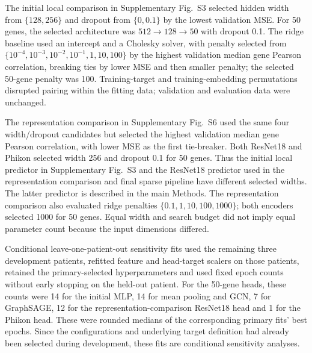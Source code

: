 The initial local comparison in Supplementary Fig.~S3 selected hidden width from $\{128,256\}$ and dropout from $\{0,0.1\}$ by the lowest validation MSE. For 50 genes, the selected architecture was $512\rightarrow128\rightarrow50$ with dropout 0.1. The ridge baseline used an intercept and a Cholesky solver, with penalty selected from $\{10^{-4},10^{-3},10^{-2},10^{-1},1,10,100\}$ by the highest validation median gene Pearson correlation, breaking ties by lower MSE and then smaller penalty; the selected 50-gene penalty was 100. Training-target and training-embedding permutations disrupted pairing within the fitting data; validation and evaluation data were unchanged.

The representation comparison in Supplementary Fig.~S6 used the same four width/dropout candidates but selected the highest validation median gene Pearson correlation, with lower MSE as the first tie-breaker. Both ResNet18 and Phikon selected width 256 and dropout 0.1 for 50 genes. Thus the initial local predictor in Supplementary Fig.~S3 and the ResNet18 predictor used in the representation comparison and final sparse pipeline have different selected widths. The latter predictor is described in the main Methods. The representation comparison also evaluated ridge penalties $\{0.1,1,10,100,1000\}$; both encoders selected 1000 for 50 genes. Equal width and search budget did not imply equal parameter count because the input dimensions differed.

Conditional leave-one-patient-out sensitivity fits used the remaining three development patients, refitted feature and head-target scalers on those patients, retained the primary-selected hyperparameters and used fixed epoch counts without early stopping on the held-out patient. For the 50-gene heads, these counts were 14 for the initial MLP, 14 for mean pooling and GCN, 7 for GraphSAGE, 12 for the representation-comparison ResNet18 head and 1 for the Phikon head. These were rounded medians of the corresponding primary fits' best epochs. Since the configurations and underlying target definition had already been selected during development, these fits are conditional sensitivity analyses.

